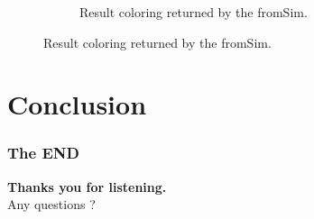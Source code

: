 \documentclass{beamer}
\begin{document}
\begin{frame}
\begin{figure}[t]
\begin{subfigure}[h]{0.4\textwidth}
		\caption{\footnotesize{Result coloring returned by the fromSim.}}\label{fig:GridColoration}
	\end{subfigure}
\end{figure}
\end{frame}

\section{Conclusion}

\begin{frame} 
\frametitle{The END}
\begin{center}
	\large{\textbf{Thanks you for listening.}}\\
	Any questions ?
	
\end{center}

\end{frame}


\end{document}
